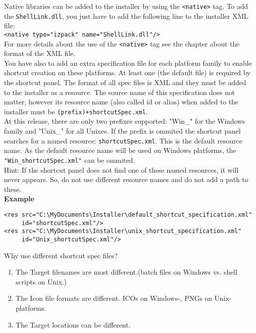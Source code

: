 Native libraries can be added to the installer by using the
\texttt{<native>} tag. To add the \texttt{ShellLink.dll}, you just
have to add the following line to the installer XML file:\\
\texttt{<native type="izpack" name="ShellLink.dll"/>}\\
For more details about the use of the \texttt{<native>} tag see the
chapter about the format of the XML file.\\

You have also to add an extra specification file for each platform family to enable shortcut creation on these platforms.
At least one (the default file) is required by the shortcut panel. The format of all spec files is XML and they must be
added to the installer as a resource. The source name of this
specification does not matter, however its resource name (also called id or alias) when added to the
installer must be \texttt{(prefix)+shortcutSpec.xml}.\\
At this release, there are only two prefixes supported: "Win\_" for the Windows family and "Unix\_" for all Unixes.
If the prefix is ommited the shortcut panel searches for a named resource: \texttt{shortcutSpec.xml}. This is the default resource name.
As the default resource name will be used on Windows platforms, the \texttt{"Win\_shortcutSpec.xml"} can be ommited.\\
Hint: If the shortcut panel does not find one of these named resources, it will never appears.
So, do not use different resource names and do not add a path to these.\\

\textbf{Example}\\

\footnotesize
\begin{verbatim}
<res src="C:\MyDocuments\Installer\default_shortcut_specification.xml"
     id="shortcutSpec.xml"/>
<res src="C:\MyDocuments\Installer\unix_shortcut_specification.xml"
     id="Unix_shortcutSpec.xml"/>
\end{verbatim}
\normalsize

Why use different shortcut spec files?\\

\begin{enumerate}
\item The Target filenames are most different.(batch files on Windows vs. shell scripts on Unix.)
\item The Icon file formats are different. ICOs on Windows-, PNGs on Unix-platforms.
\item The Target locations can be different.
\end{enumerate}

